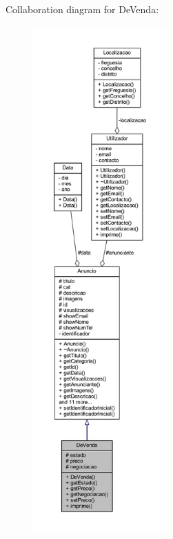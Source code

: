 Collaboration diagram for De\+Venda\+:
\nopagebreak
\begin{figure}[H]
\begin{center}
\leavevmode
\includegraphics[height=550pt]{class_de_venda__coll__graph}
\end{center}
\end{figure}
